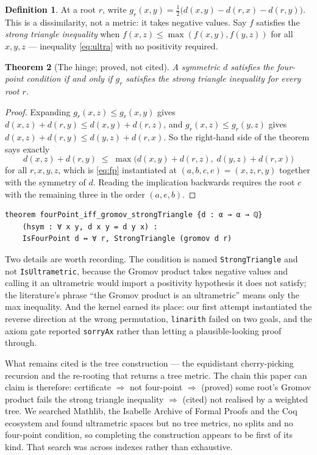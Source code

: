 \documentclass[11pt,a4paper]{article}
\newtheorem{theorem}{Theorem}[section]
\theoremstyle{definition}
\newtheorem{definition}[theorem]{Definition}
\theoremstyle{remark}
\begin{document}
\begin{definition}
At a root $r$, write
$g_r(x,y) = \tfrac{1}{2}\big(d(x,y) - d(r,x) - d(r,y)\big)$. This is a
dissimilarity, not a metric: it takes negative values. Say $f$ satisfies the
\emph{strong triangle inequality} when $f(x,z) \le \max(f(x,y), f(y,z))$ for all
$x,y,z$ --- inequality \eqref{eq:ultra} with no positivity required.
\end{definition}

\begin{theorem}[The hinge; proved, not cited]\label{thm:gromov}
A symmetric $d$ satisfies the four-point condition if and only if $g_r$ satisfies
the strong triangle inequality for every root $r$.
\end{theorem}

\begin{proof}
Expanding $g_r(x,z) \le g_r(x,y)$ gives
$d(x,z) + d(r,y) \le d(x,y) + d(r,z)$, and $g_r(x,z) \le g_r(y,z)$ gives
$d(x,z) + d(r,y) \le d(y,z) + d(r,x)$. So the right-hand side of the theorem says
exactly
\[
  d(x,z) + d(r,y) \;\le\;
  \max\!\big(d(x,y)+d(r,z),\; d(y,z)+d(r,x)\big)
\]
for all $r,x,y,z$, which is \eqref{eq:fp} instantiated at
$(a,b,c,e) = (x,z,r,y)$ together with the symmetry of $d$. Reading the
implication backwards requires the root $c$ with the remaining three in the order
$(a,e,b)$.
\end{proof}

\begin{lstlisting}[caption={The Lean statement. \texttt{\#print axioms} gives
\texttt{[propext, Classical.choice, Quot.sound]}.},label={lst:gromov}]
theorem fourPoint_iff_gromov_strongTriangle {d : α → α → ℚ}
    (hsym : ∀ x y, d x y = d y x) :
    IsFourPoint d ↔ ∀ r, StrongTriangle (gromov d r)
\end{lstlisting}

Two details are worth recording. The condition is named \texttt{StrongTriangle}
and not \texttt{IsUltrametric}, because the Gromov product takes negative values
and calling it an ultrametric would import a positivity hypothesis it does not
satisfy; the literature's phrase ``the Gromov product is an ultrametric'' means
only the max inequality. And the kernel earned its place: our first attempt
instantiated the reverse direction at the wrong permutation, \texttt{linarith}
failed on two goals, and the axiom gate reported \texttt{sorryAx} rather than
letting a plausible-looking proof through.

What remains cited is the tree construction --- the equidistant cherry-picking
recursion and the re-rooting that returns a tree metric. The chain this paper can
claim is therefore: certificate $\Rightarrow$ not four-point $\Rightarrow$
(proved) some root's Gromov product fails the strong triangle inequality
$\Rightarrow$ (cited) not realised by a weighted tree. We searched Mathlib, the
Isabelle Archive of Formal Proofs and the Coq ecosystem and found ultrametric
spaces but no tree metrics, no splits and no four-point condition, so completing
the construction appears to be first of its kind. That search was across indexes
rather than exhaustive.
\end{document}
